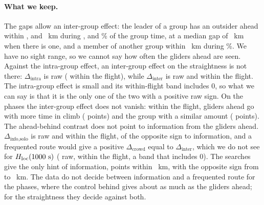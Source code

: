 \paragraph{What we keep.} The gaps allow an inter-group effect: the leader of a group has an outsider ahead within \IgRadOne, \IgRMain{} and \IgRadHigh~km during \IgShareGroupOne, \IgShareGroupFive{} and \IgShareGroupTen\% of the group time, at a median gap of \IgGapMed~km when there is one, and a member of another group within \IgRMain~km during \IgShareOtherFive\%. We have no sight range, so we cannot say how often the gliders ahead are seen. Against the intra-group effect, an inter-group effect on the straightness is not there: $\Delta_\text{intra}$ is \IgConFiveIntraRaw{} \IgConFiveIntraRawBand{} raw (\IgConFiveIntraFlight{} \IgConFiveIntraFlightBand{} within the flight), while $\Delta_\text{inter}$ is \IgConFiveInterRaw{} raw and \IgConFiveInterFlight{} \IgConFiveInterFlightBand{} within the flight. The intra-group effect is small and its within-flight band includes 0, so what we can say is that it is the only one of the two with a positive raw sign. On the phases the inter-group effect does not vanish: within the flight, gliders ahead go with more time in climb (\IgPhFiveInterClimbFlight{} points) and the group with a similar amount (\IgPhFiveIntraClimbFlight{} points).
The ahead-behind contrast does not point to information from the gliders ahead. $\Delta_\text{info,solo}$ is \IgConFiveInfoSoloRaw{} raw and \IgConFiveInfoSoloFlight{} within the flight, of the opposite sign to information, and a frequented route would give a positive $\Delta_\text{crowd}$ equal to $\Delta_\text{inter}$, which we do not see for $H_\mathrm{loc}(1000~\mathrm{s})$ (\IgConFiveCrowdRaw{} raw, \IgConFiveCrowdFlight{} within the flight, a band that includes 0). The searches give the only hint of information, \IgSearchSoloDiffA{} points within \IgBinLow~km, with the opposite sign from \IgBinLowTwo{} to \IgEdgeFive~km. The data do not decide between information and a frequented route for the phases, where the control behind gives about as much as the gliders ahead; for the straightness they decide against both.
